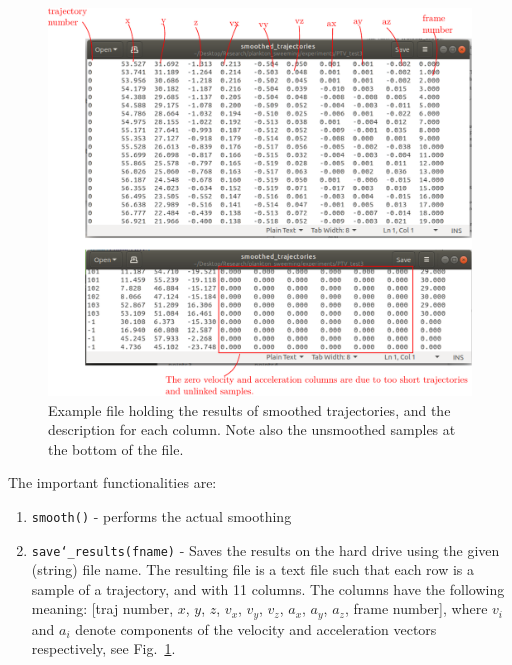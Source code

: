 \documentclass[10pt,a4paper]{article}
\begin{document}
\begin{figure}[h!]
	\centering
	\includegraphics[width=12cm]{smoothed_trajfile.pdf}
	\caption{Example file holding the results of smoothed trajectories, and the description for each column. Note also the unsmoothed samples at the bottom of the file. \label{fig:smoothedfile}}
\end{figure}

The important functionalities are:

\begin{enumerate}
	\item \texttt{smooth()} - performs the actual smoothing
	\item \texttt{save\char`_results(fname)} - Saves the results on the hard drive using the given (string) file name. The resulting file is a text file such that each row is a sample of a trajectory, and with 11 columns. The columns have the following meaning:
	[traj number, $x$, $y$, $z$, $v_x$, $v_y$, $v_z$, $a_x$, $a_y$, $a_z$, frame number], where $v_i$ and $a_i$ denote components of the velocity and acceleration vectors respectively, see Fig.~\ref{fig:smoothedfile}.
\end{enumerate}







\end{document}
